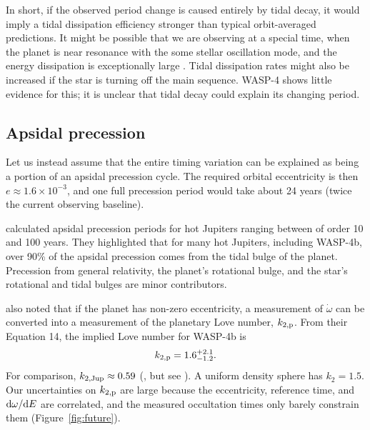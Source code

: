 \documentclass[12pt,twocolumn,tighten]{aastex62}
\begin{document}
In short, if the observed period change is caused entirely by tidal
decay, it would imply a tidal dissipation efficiency stronger than
typical orbit-averaged predictions.  It might be possible that we are
observing at a special time, when the planet is near resonance with the
some stellar oscillation mode, and the energy dissipation is
exceptionally large \citep{ogilvie_tidal_2014,essick_orbital_2016}.
Tidal dissipation rates might also be increased if the star is turning
off the main sequence.  WASP-4 shows little evidence for this; it is
unclear that tidal decay could explain its changing period.


\subsection{Apsidal precession}
\label{sec:apsidal_precession}

Let us instead assume that the entire timing variation can be explained
as being a portion of an apsidal precession cycle.  The required orbital
eccentricity is then $e\approx 1.6\times10^{-3}$, and one full precession
period would take about 24 years (twice the
current observing baseline).

\citet{ragozzine_probing_2009} calculated apsidal precession periods for
hot Jupiters ranging between of order 10 and 100 years.  They
highlighted that for many hot Jupiters, including WASP-4b, over 90\% of
the apsidal precession comes from the tidal bulge of the planet.
Precession from general relativity, the planet's rotational bulge, and
the star's rotational and tidal bulges are minor contributors.

\citet{ragozzine_probing_2009} also noted that if the planet has
non-zero eccentricity, a measurement of $\dot{\omega}$ can be converted
into a measurement of the planetary Love number, $k_{2,\rm p}$.
From their Equation 14, the implied Love number for WASP-4b is
\begin{equation}
k_{2,{\rm p}} = 1.6^{+2.1}_{-1.2}.
\end{equation}
For comparison, $k_{2,{\rm Jup}} \approx 0.59$
(\citealt{wahl_tidal_2016}, but see \citealt{ni_empirical_2018}).  A
uniform density sphere has $k_2 = 1.5$.  Our uncertainties on
$k_{2,{\rm p}}$ are large because the eccentricity, reference time, and
${\rm d}\omega/{\rm d}E$ are correlated, and the measured occultation
times only barely constrain them (Figure~\ref{fig:future}).
\end{document}
